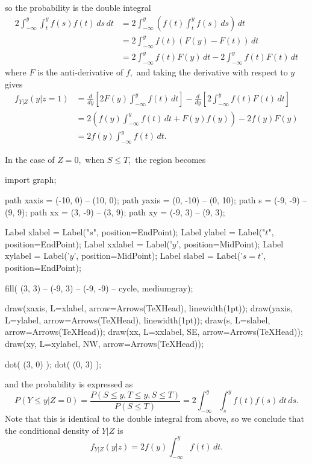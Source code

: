 \documentclass{article}
\begin{document}
\begin{enumerate}
\begin{enumerate}
\begin{enumerate}
\begin{soln}
				so the probability is the double integral 
				\begin{align*}
					2\int_{-\infty}^{y} \int_{t}^y f(s)f(t)\, ds\, dt &= 2\int_{-\infty}^y \left( f(t)\int_t^y f(s)\, ds \right)\, dt \\
					&= 2\int_{-\infty}^y f(t)(F(y)-F(t))\, dt \\
					&= 2\int_{-\infty}^y f(t)F(y)\, dt - 2\int_{-\infty}^y f(t)F(t)\, dt 
				\end{align*} where $F$ is the anti-derivative of $f,$ and taking the derivative with respect to $y$ gives 
				\begin{align*}
					f_{Y|Z}(y|z=1) &= \frac{d}{dy}\left[ 2F(y)\int_{-\infty}^y f(t)\, dt  \right] - \frac{d}{dy}\left[ 2\int_{-\infty}^y f(t)F(t)\, dt \right] \\
					&= 2\left( f(y)\int_{-\infty}^y f(t)\, dt + F(y)f(y) \right) - 2f(y)F(y) \\ 
					&=  2f(y)\int_{-\infty}^y f(t)\, dt.
				\end{align*}

				In the case of $Z=0,$ when $S\le T,$ the region becomes

				\begin{center}
					\begin{asy}
						import graph;

						path xaxis = (-10, 0) -- (10, 0);
						path yaxis = (0, -10) -- (0, 10);
						path s = (-9, -9) -- (9, 9);
						path xx = (3, -9) -- (3, 9);
						path xy = (-9, 3) -- (9, 3);

						Label xlabel = Label("$s$", position=EndPoint);
						Label ylabel = Label("$t$", position=EndPoint);
						Label xxlabel = Label('$y$', position=MidPoint);
						Label xylabel = Label('$y$', position=MidPoint);
						Label slabel = Label('$s=t$', position=EndPoint);

						fill( (3, 3) -- (-9, 3) -- (-9, -9) -- cycle, mediumgray);

						draw(xaxis, L=xlabel, arrow=Arrows(TeXHead), linewidth(1pt));
						draw(yaxis, L=ylabel, arrow=Arrows(TeXHead), linewidth(1pt));
						draw(s, L=slabel, arrow=Arrows(TeXHead));
						draw(xx, L=xxlabel, SE, arrow=Arrows(TeXHead));
						draw(xy, L=xylabel, NW, arrow=Arrows(TeXHead));

						dot( (3, 0) );
						dot( (0, 3) );
					\end{asy}
				\end{center}

				and the probability is expressed as \[P(Y\le y|Z=0)=\frac{P(S\le y, T\le y, S\le T)}{P(S\le T)} = 2\int_{-\infty}^y \int_{s}^y f(t) f(s)\, dt\, ds.\] Note that this is identical to the double integral from above, so we conclude that the conditional density of $Y|Z$ is \[f_{Y|Z}(y|z)=2f(y)\int_{-\infty}^y f(t)\, dt.\]


\end{soln}
\end{enumerate}
\end{enumerate}
\end{enumerate}
\end{document}
